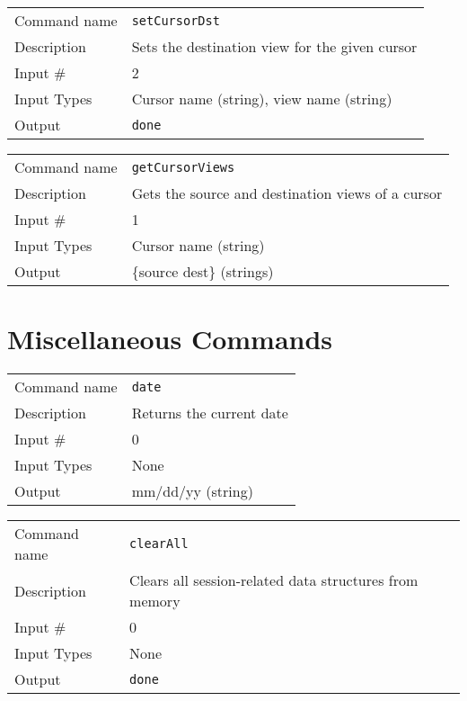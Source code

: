 \noindent
\begin{tabular}{l|p{5in}}
\hline
Command name & {\tt setCursorDst} \\
Description  & Sets the destination view for the given cursor \\
Input \#     & 2 \\
Input Types  & Cursor name (string), view name (string) \\
Output       & {\tt done} \\
\hline
\end{tabular}

\bigskip

\noindent
\begin{tabular}{l|p{5in}}
\hline
Command name & {\tt getCursorViews} \\
Description  & Gets the source and destination views of a cursor \\
Input \#     & 1 \\
Input Types  & Cursor name (string) \\
Output       & \{source dest\} (strings) \\
\hline
\end{tabular}

\section{Miscellaneous Commands}

\noindent
\begin{tabular}{l|p{5in}}
\hline
Command name & {\tt date} \\
Description  & Returns the current date \\
Input \#     & 0 \\
Input Types  & None \\
Output       & mm/dd/yy (string) \\
\hline
\end{tabular}

\bigskip

\noindent
\begin{tabular}{l|p{5in}}
\hline
Command name & {\tt clearAll} \\
Description  & Clears all session-related data structures from memory \\
Input \#     & 0 \\
Input Types  & None \\
Output       & {\tt done} \\
\hline
\end{tabular}

